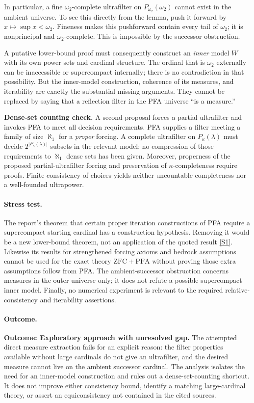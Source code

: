 \documentclass[11pt,a4paper]{article}
\newcommand{\sref}[2]{\hyperlink{source:#1:#2}{[S#2]}}
\numberwithin{equation}{section}
\begin{document}
In particular, a fine $\omega_2$-complete ultrafilter on $P_{\omega_2}(\omega_2)$ cannot exist in the ambient universe. To see this directly from the lemma, push it forward by $x\mapsto\sup x<\omega_2$. Fineness makes this pushforward contain every tail of $\omega_2$; it is nonprincipal and $\omega_2$-complete. This is impossible by the successor obstruction.

A putative lower-bound proof must consequently construct an \emph{inner} model $W$ with its own power sets and cardinal structure. The ordinal that is $\omega_2$ externally can be inaccessible or supercompact internally; there is no contradiction in that possibility. But the inner-model construction, coherence of its measures, and iterability are exactly the substantial missing arguments. They cannot be replaced by saying that a reflection filter in the PFA universe ``is a measure.''

\textbf{Dense-set counting check.} A second proposal forces a partial ultrafilter and invokes PFA to meet all decision requirements. PFA supplies a filter meeting a family of size $\aleph_1$ for a \emph{proper} forcing. A complete ultrafilter on $P_\kappa(\lambda)$ must decide $2^{|P_\kappa(\lambda)|}$ subsets in the relevant model; no compression of those requirements to $\aleph_1$ dense sets has been given. Moreover, properness of the proposed partial-ultrafilter forcing and preservation of $\kappa$-completeness require proofs. Finite consistency of choices yields neither uncountable completeness nor a well-founded ultrapower.

\paragraph{Stress test.}
The report's theorem that certain proper iteration constructions of PFA require a supercompact starting cardinal has a construction hypothesis. Removing it would be a new lower-bound theorem, not an application of the quoted result \sref{30006783}{1}. Likewise its results for strengthened forcing axioms and bedrock assumptions cannot be used for the exact theory $\mathrm{ZFC}+\mathrm{PFA}$ without proving those extra assumptions follow from PFA. The ambient-successor obstruction concerns measures in the outer universe only; it does not refute a possible supercompact inner model. Finally, no numerical experiment is relevant to the required relative-consistency and iterability assertions.

\paragraph{Outcome.}
\textbf{Outcome: Exploratory approach with unresolved gap.}
The attempted direct measure extraction fails for an explicit reason: the filter properties available without large cardinals do not give an ultrafilter, and the desired measure cannot live on the ambient successor cardinal. The analysis isolates the need for an inner-model construction and rules out a dense-set-counting shortcut. It does not improve either consistency bound, identify a matching large-cardinal theory, or assert an equiconsistency not contained in the cited sources.
\end{document}

